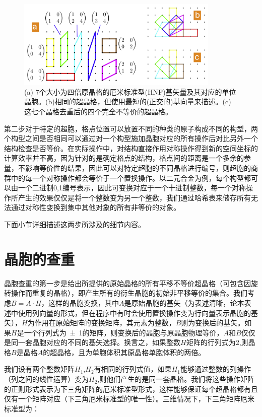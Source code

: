 \begin{figure}
  \includegraphics[width=0.86\textwidth]{figs/ch4_2d_square_lattice.png}
  \caption{(a) 7个大小为四倍原晶格的厄米标准型(HNF)基矢量及其对应的单位晶胞。(b)相同的超晶格，但使用最短的(正交的)基向量来描述。(c)这七个晶格去重后的四个完全不等价的超晶格。}
  \label{fig:ch4_2d_square_lattice}
\end{figure}

第二步对于特定的超胞，格点位置可以放置不同的种类的原子构成不同的构型，两个构型之间是否相同可以通过对一个构型施加晶胞对应的所有操作后对比另外一个结构检查是否等价。在实际操作中，对结构直接作用对称操作得到新的空间坐标的计算效率并不高，因为针对的是确定格点的结构，格点间的距离是一个多余的参量，不影响等价性的结果，因此可以对特定超胞的不同晶格进行编号，则超胞的商群中的每一个对称操作都会等价于一个置换操作。以二元合金为例，每个构型都可以由一个二进制0,1编号表示，因此可变换对应于一个十进制整数，每一个对称操作所产生的效果仅仅是将一个整数变为另一个整数，我们通过哈希表来储存所有无法通过对称性变换到集中其他对象的所有非等价的对象。

下面小节详细描述这两步所涉及的细节内容。

\section{晶胞的查重}
晶胞查重的第一步是给出所提供的原始晶格的所有平移不等价超晶格（可包含因旋转操作而重复的晶格），即产生所有的衍生晶胞的初始非平移等价的集合。我们考虑$B=A\cdot H$，这样的晶胞变换，其中$A$是原始晶胞的基矢（为表述清晰，论本表述中使用列向量的形式，但在程序中有时会使用置换操作变为行向量表示晶胞的基矢），$H$为作用在原始矩阵的变换矩阵，其元素为整数，$B$则为变换后的基矢。如果$H$是一个行列式为\num{+-1}的矩阵，则变换后的晶胞与原晶胞物理等价，$A$和$B$仅仅是同一套晶胞对应的不同的基矢选择。换言之，如果整数$H$矩阵的行列式为\num{2},则晶格$B$是晶格$A$的超晶格，且为单胞体积其原晶格单胞体积的两倍。

我们设有两个整数矩阵$H_1$,$H_2$有相同的行列式值，如果$H_1$能够通过整数的列操作（列之间的线性运算）变为$H_2$,则他们产生的是同一套晶格。我们将这些操作矩阵的正则形式表示为下三角矩阵的厄米标准型形式，这样能够保证每个超晶格都有且仅有一个矩阵对应（下三角厄米标准型的唯一性\cite{santoro1973coincidence}）。三维情况下，下三角矩阵厄米标准型为：

